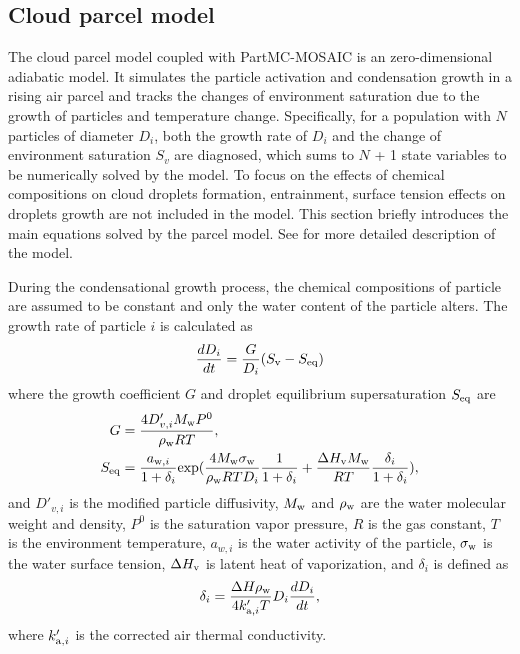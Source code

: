 \documentclass[edeposit,fullpage]{uiucthesis2009}
\begin{document}
\subsection{Cloud parcel model}
\label{section:cloud-parcel-model}
The cloud parcel model coupled with PartMC-MOSAIC is an zero-dimensional adiabatic model. It simulates the particle activation and condensation growth in a rising air parcel and tracks the changes of environment saturation due to the growth of particles and temperature change. Specifically, for a population with $N$ particles of diameter $D_i$, both the growth rate of $D_i$ and the change of environment saturation $S_v$ are diagnosed, which sums to $N$ + 1 state variables to be numerically solved by the model. To focus on the effects of chemical compositions on cloud droplets formation, entrainment, surface tension effects on droplets growth are not included in the model. This section briefly introduces the main equations solved by the parcel model. See \citet{ching2012impacts} for more detailed description of the model. 

During the condensational growth process, the chemical compositions of particle are assumed to be constant and only the water content of the particle alters. The growth rate of particle $i$ is calculated as
\begin{equation}
\centering
\frac{dD_i}{dt} = \frac{G}{D_i}(S_{\rm v}-S_{\rm eq})
\label{eq:cloud-parcel} 
\end{equation}
where the growth coefficient $G$ and droplet equilibrium supersaturation $S_{\rm eq}$ are
\begin{equation}
\centering
\begin{aligned}
 G & = \frac{4D'_{v,i}M_{\rm w}P^0}{\rho_{\rm w}RT}  ,\\
 S_{\rm eq} & = \frac{a_{{\rm w},i}}{1+\delta_i}{\rm exp}(\frac{4M_{\rm w}\sigma_{\rm w}}{\rho_{\rm w}RTD_i}\frac{1}{1+\delta_i} + \frac{\Delta H_{\rm v}M_{\rm w}}{RT}\frac{\delta_i}{1+\delta_i}),
\end{aligned}
\end{equation}
and $D'_{v,i}$ is the modified particle diffusivity, $M_{\rm w}$ and $\rho_{\rm w }$ are the water molecular weight and density, $P^0$ is the saturation vapor pressure, $R$ is the gas constant, $T$ is the environment temperature, $a_{w,i}$ is the water activity of the particle, $\sigma_{\rm w}$ is the water surface tension, $\Delta H_{\rm v}$ is latent heat of vaporization, and $\delta_i$ is defined as 
\begin{equation}
    \delta_i = \frac{\Delta H_{\rm }\rho_{\rm w}}{4k'_{{\rm a},i}T}D_i\frac{dD_i}{dt},
\end{equation}
where $k'_{{\rm a},i}$ is the corrected air thermal conductivity. 
\end{document}
